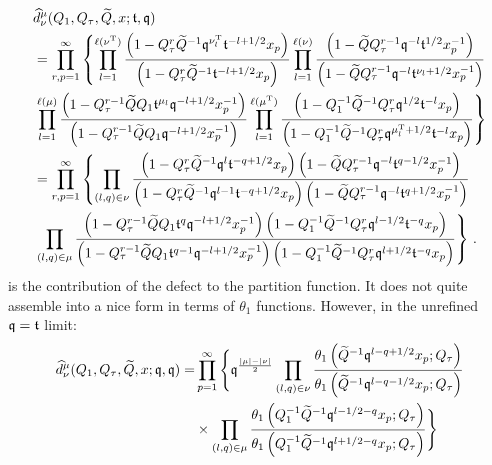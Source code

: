 \documentclass[main.tex]{subfiles}
\begin{document}
\begin{align}\label{eqn:defectfactor}
&\widehat{d}^{\mu}_{\nu}(Q_1,Q_{\tau},\widetilde{Q},x;\mathfrak{t},\mathfrak{q})\nonumber\\
&\begin{aligned}
&=\prod_{r,p=1}^{\infty}\left\{\prod_{l=1}^{\ell(\nu^{\operatorname{T}})}\frac{\left(1-Q_{\tau}^{r}\widetilde{Q}^{-1}\mathfrak{q}^{\nu^{\operatorname{T}}_l}\mathfrak{t}^{-l+1/2}x_p\right)}{\left(1-Q_{\tau}^{r}\widetilde{Q}^{-1}\mathfrak{t}^{-l+1/2}x_p\right)}\prod_{l=1}^{\ell(\nu)}\frac{\left(1-\widetilde{Q}Q_{\tau}^{r-1}\mathfrak{q}^{-l}\mathfrak{t}^{1/2}x_p^{-1}\right)}{\left(1-\widetilde{Q}Q_{\tau}^{r-1}\mathfrak{q}^{-l}\mathfrak{t}^{\nu_l+1/2}x_p^{-1}\right)}\right.\\
&\left.\prod_{l=1}^{\ell(\mu)}\frac{\left(1-Q_{\tau}^{r-1}\widetilde{Q}Q_1\mathfrak{t}^{\mu_l}\mathfrak{q}^{-l+1/2}x_p^{-1}\right)}{\left(1-Q_{\tau}^{r-1}\widetilde{Q}Q_1\mathfrak{q}^{-l+1/2}x^{-1}_p\right)}\prod_{l=1}^{\ell(\mu^{\operatorname{T}})}\frac{\left(1-Q_1^{-1}\widetilde{Q}^{-1}Q_{\tau}^{r}\mathfrak{q}^{1/2}\mathfrak{t}^{-l}x_p\right)}{\left(1-Q_1^{-1}\widetilde{Q}^{-1}Q_{\tau}^{r}\mathfrak{q}^{\mu^{\operatorname{T}}_l+1/2}\mathfrak{t}^{-l}x_p\right)}\right\}\\
\end{aligned}\\
&\begin{aligned}
&=\prod_{r,p=1}^{\infty}\left\{\prod_{(l,q)\in\nu}\frac{\left(1-Q_{\tau}^{r}\widetilde{Q}^{-1}\mathfrak{q}^{l}\mathfrak{t}^{-q+1/2}x_p\right)\left(1-\widetilde{Q}Q_{\tau}^{r-1}\mathfrak{q}^{-l}\mathfrak{t}^{q-1/2}x_p^{-1}\right)}{\left(1-Q_{\tau}^{r}\widetilde{Q}^{-1}\mathfrak{q}^{l-1}\mathfrak{t}^{-q+1/2}x_p\right)\left(1-\widetilde{Q}Q_{\tau}^{r-1}\mathfrak{q}^{-l}\mathfrak{t}^{q+1/2}x_p^{-1}\right)}\right.\\
&\left.\prod_{(l,q)\in\mu}\frac{\left(1-Q_{\tau}^{r-1}\widetilde{Q}Q_1\mathfrak{t}^{q}\mathfrak{q}^{-l+1/2}x_p^{-1}\right)\left(1-Q_1^{-1}\widetilde{Q}^{-1}Q_{\tau}^{r}\mathfrak{q}^{l-1/2}\mathfrak{t}^{-q}x_p\right)}{\left(1-Q_{\tau}^{r-1}\widetilde{Q}Q_1\mathfrak{t}^{q-1}\mathfrak{q}^{-l+1/2}x^{-1}_p\right)\left(1-Q_1^{-1}\widetilde{Q}^{-1}Q_{\tau}^{r}\mathfrak{q}^{l+1/2}\mathfrak{t}^{-q}x_p\right)}\right\}\,.
\end{aligned}
\end{align}
is the contribution of the defect to the partition function. It does not quite assemble into a nice form in terms of $\theta_1$ functions. However, in the unrefined $\mathfrak{q}=\mathfrak{t}$ limit:
\begin{equation}
\begin{aligned}
\widehat{d}^{\mu}_{\nu}(Q_1,Q_{\tau},\widetilde{Q},x;\mathfrak{q},\mathfrak{q})=&\prod_{p=1}^{\infty}\Bigg\{\mathfrak{q}^{\frac{|\mu|-|\nu|}{2}}\prod_{(l,q)\in\nu}\frac{\theta_1\left(\widetilde{Q}^{-1}\mathfrak{q}^{l-q+1/2}x_p;Q_{\tau}\right)}{\theta_1\left(\widetilde{Q}^{-1}\mathfrak{q}^{l-q-1/2}x_p;Q_{\tau}\right)}\\
&\times\prod_{(l,q)\in\mu}\frac{\theta_1\left(Q_1^{-1}\widetilde{Q}^{-1}\mathfrak{q}^{l-1/2-q}x_p;Q_{\tau}\right)}{\theta_1\left(Q_1^{-1}\widetilde{Q}^{-1}\mathfrak{q}^{l+1/2-q}x_p;Q_{\tau}\right)}\Bigg\}
\end{aligned}
\end{equation}
\end{document}
